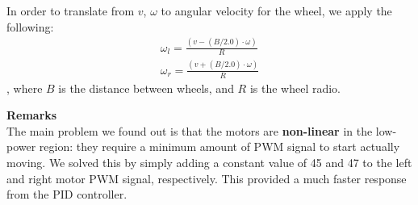 In order to translate from $v$, $\omega$ to angular velocity for the wheel, we apply the following:
\begin{align}
\omega_l = \frac{(v - (B/2.0) \cdot \omega)}{R}\\
\omega_r = \frac{(v + (B/2.0) \cdot \omega)}{R}
\end{align}
, where $B$ is the distance between wheels, and $R$ is the wheel radio. 

\textbf{Remarks}\\
The main problem we found out is that the motors are \textbf{non-linear} in the low-power region: they require a minimum amount of PWM signal to start actually moving. We solved this by simply adding a constant value of 45 and 47 to the left and right motor PWM signal, respectively. This provided a much faster response from the PID controller. 